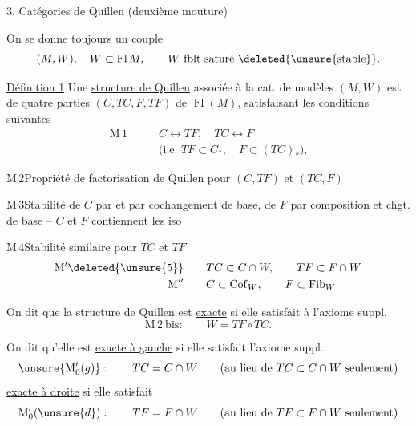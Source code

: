 3. Catégories de Quillen (deuxième mouture)

On se donne toujours un couple
\[
(M,W),\quad W\subset\operatorname{Fl}M,\qquad W\ \text{fblt saturé}\ \deleted{\text{\unsure{stable}}}.
\]

\uline{Définition 1}\unsure{:} Une \uline{structure de Quillen} \uline{} associée à la cat. de modèles $(M,W)$ est   de quatre parties $(C,TC,F,TF)$ de $\operatorname{Fl}(M)$, satisfaisant les conditions suivantes
\[
\begin{aligned}
\mathrm{M}\,1\qquad & C\longleftrightarrow TF,\quad TC\longleftrightarrow F\\
&\text{(i.e. }TF\subset C_{*},\quad F\subset(TC)_{*}\text{),}
\end{aligned}
\]

$\mathrm{M}\,2$\qquad Propriété de factorisation de Quillen pour $(C,TF)$ et $(TC,F)$

$\mathrm{M}\,3$\qquad Stabilité de $C$ par  et par cochangement de base, de $F$ par composition et chgt. de base -- $C$ et $F$ contiennent les iso

$\mathrm{M}\,4$\qquad Stabilité similaire pour $TC$ et $TF$
\[
\begin{aligned}
\mathrm{M}'\deleted{\unsure{5}}\qquad & TC\subset C\cap W,\qquad TF\subset F\cap W\\
\mathrm{M}''\qquad & C\subset\operatorname{Cof}_{W},\qquad F\subset\operatorname{Fib}_{W}
\end{aligned}
\]

On dit que la structure de Quillen est \uline{exacte} si elle satisfait à l'axiome suppl.
\[
\mathrm{M}\,2\ \mathrm{bis}:\qquad W=TF\circ TC.
\]

On dit qu'elle est \uline{exacte à gauche} si elle satisfait l'axiome suppl.
\[
\unsure{\mathrm M'_0(g)}:\qquad TC=C\cap W\qquad \text{(au lieu de }TC\subset C\cap W\text{ seulement)}
\]
\uline{exacte à droite} si elle satisfait
\[
\mathrm M'_0(\unsure{d}):\qquad TF=F\cap W\qquad \text{(au lieu de }TF\subset F\cap W\text{ seulement)}
\]
